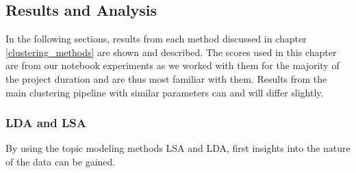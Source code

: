 \subsection{Results and Analysis}

In the following sections, results from each method discussed in chapter \ref{clustering_methods} are shown and described.
The scores used in this chapter are from our notebook experiments as we worked with them for the majority of the project duration and are thus most familiar with them. Results from the main clustering pipeline with similar parameters can and will differ slightly.

\subsubsection{LDA and LSA}
By using the topic modeling methods LSA and LDA, first insights into the nature of the data can be gained.

